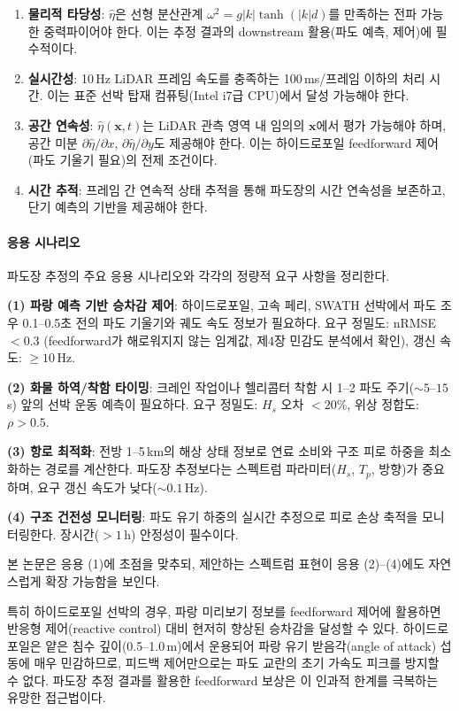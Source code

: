 \documentclass[11pt]{report}
\numberwithin{equation}{chapter}
\numberwithin{figure}{chapter}
\numberwithin{table}{chapter}
\begin{document}
\begin{enumerate}
  \item \textbf{물리적 타당성}: $\hat{\eta}$은 선형 분산관계
        $\omega^2 = g|k|\tanh(|k|d)$를 만족하는 전파 가능한 중력파이어야 한다.
        이는 추정 결과의 downstream 활용(파도 예측, 제어)에 필수적이다.
  \item \textbf{실시간성}: 10\,Hz LiDAR 프레임 속도를 충족하는
        100\,ms/프레임 이하의 처리 시간.
        이는 표준 선박 탑재 컴퓨팅(Intel i7급 CPU)에서 달성 가능해야 한다.
  \item \textbf{공간 연속성}: $\hat{\eta}(\mathbf{x}, t)$는
        LiDAR 관측 영역 내 임의의 $\mathbf{x}$에서 평가 가능해야 하며,
        공간 미분 $\partial\hat{\eta}/\partial x$,
        $\partial\hat{\eta}/\partial y$도 제공해야 한다.
        이는 하이드로포일 feedforward 제어(파도 기울기 필요)의 전제 조건이다.
  \item \textbf{시간 추적}: 프레임 간 연속적 상태 추적을 통해
        파도장의 시간 연속성을 보존하고, 단기 예측의 기반을 제공해야 한다.
\end{enumerate}

\paragraph{응용 시나리오}
파도장 추정의 주요 응용 시나리오와 각각의 정량적 요구 사항을 정리한다.

\textbf{(1) 파랑 예측 기반 승차감 제어}: 하이드로포일, 고속 페리, SWATH 선박에서
파도 조우 0.1--0.5초 전의 파도 기울기와 궤도 속도 정보가 필요하다.
요구 정밀도: nRMSE $< 0.3$ (feedforward가 해로워지지 않는 임계값,
제4장 민감도 분석에서 확인), 갱신 속도: $\geq 10$\,Hz.

\textbf{(2) 화물 하역/착함 타이밍}: 크레인 작업이나 헬리콥터 착함 시
1--2 파도 주기($\sim 5$--$15$\,s) 앞의 선박 운동 예측이 필요하다.
요구 정밀도: $H_s$ 오차 $< 20\%$, 위상 정합도: $\rho > 0.5$.

\textbf{(3) 항로 최적화}: 전방 1--5\,km의 해상 상태 정보로
연료 소비와 구조 피로 하중을 최소화하는 경로를 계산한다.
파도장 추정보다는 스펙트럼 파라미터($H_s$, $T_p$, 방향)가 중요하며,
요구 갱신 속도가 낮다($\sim 0.1$\,Hz).

\textbf{(4) 구조 건전성 모니터링}: 파도 유기 하중의 실시간 추정으로
피로 손상 축적을 모니터링한다. 장시간($> 1$\,h) 안정성이 필수이다.

본 논문은 응용 (1)에 초점을 맞추되, 제안하는 스펙트럼 표현이
응용 (2)--(4)에도 자연스럽게 확장 가능함을 보인다.

특히 하이드로포일 선박의 경우, 파랑 미리보기 정보를
feedforward 제어에 활용하면 반응형 제어(reactive control) 대비
현저히 향상된 승차감을 달성할 수 있다.
하이드로포일은 얕은 침수 깊이(0.5--1.0\,m)에서 운용되어
파랑 유기 받음각(angle of attack) 섭동에 매우 민감하므로,
피드백 제어만으로는 파도 교란의 초기 가속도 피크를 방지할 수 없다.
파도장 추정 결과를 활용한 feedforward 보상은 이 인과적 한계를 극복하는
유망한 접근법이다.
\end{document}
